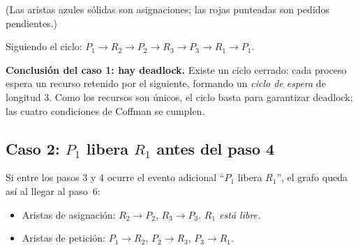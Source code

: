 \documentclass[11pt,a4paper]{article}
\begin{document}
\begin{center}
\end{center}

(Las aristas azules sólidas son asignaciones; las rojas punteadas son
pedidos pendientes.)

Siguiendo el ciclo:
$P_1 \to R_2 \to P_2 \to R_3 \to P_3 \to R_1 \to P_1$.

\textbf{Conclusión del caso 1: hay deadlock.} Existe un ciclo cerrado:
cada proceso espera un recurso retenido por el siguiente, formando un
\emph{ciclo de espera} de longitud 3. Como los recursos son únicos, el
ciclo basta para garantizar deadlock; las cuatro condiciones de Coffman
se cumplen.

\subsection*{Caso 2: $P_1$ libera $R_1$ antes del paso 4}

Si entre los pasos 3 y 4 ocurre el evento adicional ``$P_1$ libera
$R_1$'', el grafo queda así al llegar al paso~6:

\begin{itemize}[leftmargin=*,nosep]
    \item Aristas de asignación: $R_2 \to P_2$, $R_3 \to P_3$.
        \emph{$R_1$ está libre.}
    \item Aristas de petición: $P_1 \to R_2$, $P_2 \to R_3$, $P_3 \to R_1$.
\end{itemize}
\end{document}
